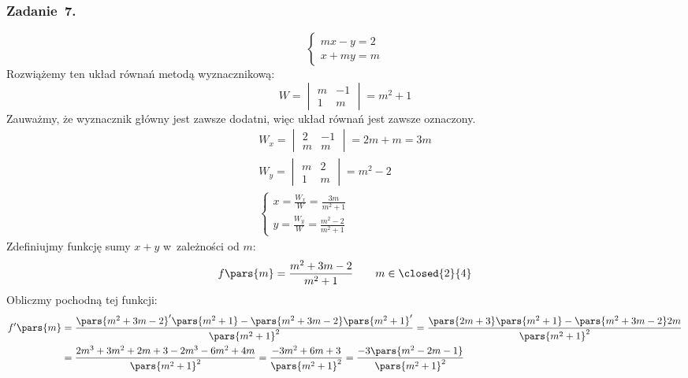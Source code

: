 \subsubsection*{Zadanie~7.}
\begin{equation*}
    \begin{cases}
        mx - y = 2\\
        x + my = m
    \end{cases}
\end{equation*}
Rozwiążemy ten układ równań metodą wyznacznikową:
\begin{equation*}
    W = \begin{vmatrix}
            m & -1\\
            1 & m
        \end{vmatrix} = m^2 + 1
\end{equation*}
Zauważmy, że wyznacznik główny jest zawsze dodatni, więc układ równań jest zawsze oznaczony.
\begin{gather*}
    W_x = \begin{vmatrix}
            2 & -1\\
            m & m
        \end{vmatrix} = 2m + m = 3m\\
    W_y = \begin{vmatrix}
            m & 2\\
            1 & m
        \end{vmatrix} = m^2 - 2\\
    \begin{cases}
        x = \frac{W_x}{W} = \frac{3m}{m^2 + 1}\\
        y = \frac{W_y}{W} = \frac{m^2 - 2}{m^2 + 1}
    \end{cases}
\end{gather*}
Zdefiniujmy funkcję sumy \(x + y\) w~zależności od \(m\):
\begin{equation*}
    f\pars{m}
        = \frac{m^2 + 3m - 2}{m^2 + 1} \qquad m \in \closed{2}{4}
\end{equation*}
Obliczmy pochodną tej funkcji:
\begin{equation*}
    \begin{split}
        f'\pars{m}
            &= \frac{\pars{m^2 + 3m - 2}'\pars{m^2 + 1} - \pars{m^2 + 3m - 2}\pars{m^2 + 1}'}{\pars{m^2 + 1}^2}
            = \frac{\pars{2m + 3}\pars{m^2 + 1} - \pars{m^2 + 3m - 2}2m}{\pars{m^2 + 1}^2}\\
            &= \frac{2m^3 + 3m^2 + 2m + 3 - 2m^3 - 6m^2 + 4m}{\pars{m^2 + 1}^2}
            = \frac{-3m^2 + 6m + 3}{\pars{m^2 + 1}^2}
            = \frac{-3\pars{m^2 - 2m - 1}}{\pars{m^2 + 1}^2}
    \end{split}
\end{equation*}
